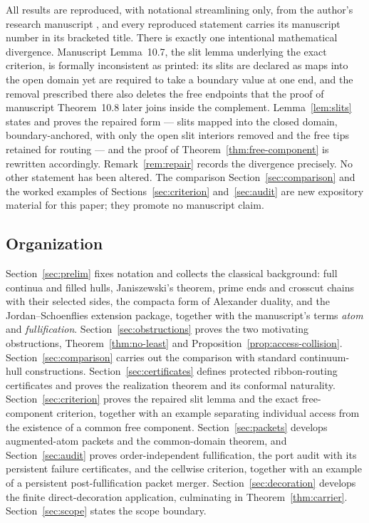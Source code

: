 \documentclass[11pt,reqno]{amsart}
\theoremstyle{definition}
\theoremstyle{remark}
\begin{document}
All results are reproduced, with notational streamlining only, from the
author's research manuscript \cite{MWman}, and every reproduced statement
carries its manuscript number in its bracketed title.  There is exactly one
intentional mathematical divergence.  Manuscript Lemma~10.7, the slit lemma
underlying the exact criterion, is formally inconsistent as printed: its
slits are declared as maps into the open domain yet are required to take a
boundary value at one end, and the removal prescribed there also deletes the
free endpoints that the proof of manuscript Theorem~10.8 later joins inside
the complement.  Lemma~\ref{lem:slits} states and proves the repaired
form --- slits mapped into the closed domain, boundary-anchored, with only
the open slit interiors removed and the free tips retained for routing ---
and the proof of Theorem~\ref{thm:free-component} is rewritten accordingly.
Remark~\ref{rem:repair} records the divergence precisely.  No other
statement has been altered.  The comparison Section~\ref{sec:comparison} and
the worked examples of Sections~\ref{sec:criterion} and~\ref{sec:audit} are
new expository material for this paper; they promote no manuscript claim.

\subsection{Organization}\label{subsec:A-roadmap}

Section~\ref{sec:prelim} fixes notation and collects the classical
background: full continua and filled hulls, Janiszewski's theorem, prime
ends and crosscut chains with their selected sides, the compacta form of
Alexander duality, and the Jordan--Schoenflies extension package, together
with the manuscript's terms \emph{atom} and \emph{fullification}.
Section~\ref{sec:obstructions} proves the two motivating obstructions,
Theorem~\ref{thm:no-least} and Proposition~\ref{prop:access-collision}.
Section~\ref{sec:comparison} carries out the comparison with standard
continuum-hull constructions.  Section~\ref{sec:certificates} defines
protected ribbon-routing certificates and proves the realization theorem and
its conformal naturality.  Section~\ref{sec:criterion} proves the repaired
slit lemma and the exact free-component criterion, together with an example
separating individual access from the existence of a common free component.
Section~\ref{sec:packets} develops augmented-atom packets and the
common-domain theorem, and Section~\ref{sec:audit} proves order-independent
fullification, the port audit with its persistent failure certificates, and
the cellwise criterion, together with an example of a persistent
post-fullification packet merger.  Section~\ref{sec:decoration} develops the
finite direct-decoration application, culminating in
Theorem~\ref{thm:carrier}.  Section~\ref{sec:scope} states the scope
boundary.
\end{document}

